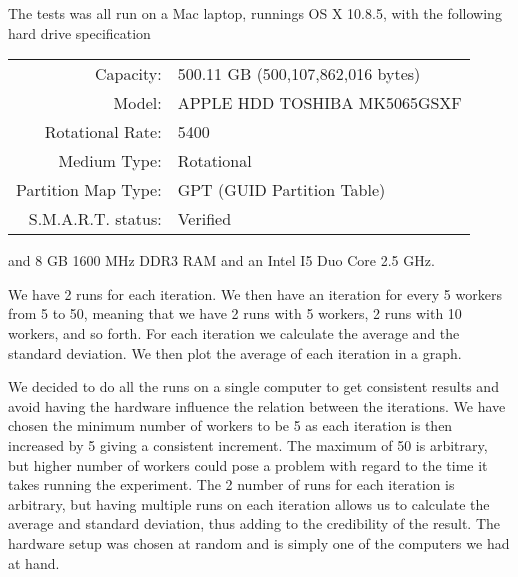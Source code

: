 \documentclass[a4paper, 11pt]{article}
\begin{document}
The tests was all run on a Mac laptop, runnings OS X 10.8.5, with the following hard drive specification

\begin{table}[H]
\begin{tabular}{rl}
Capacity:           & 500.11 GB (500,107,862,016 bytes) \\ 
Model:              & APPLE HDD TOSHIBA MK5065GSXF      \\   
Rotational Rate:    & 5400                              \\   
Medium Type:        & Rotational                        \\   
Partition Map Type: & GPT (GUID Partition Table)        \\   
S.M.A.R.T. status:  & Verified                             
\end{tabular}
\end{table}

and 8 GB 1600 MHz DDR3 RAM and an Intel I5 Duo Core 2.5 GHz.

We have 2 runs for each iteration. We then have an iteration for every 5 workers from 5 to 50, meaning that we have 2 runs with 5 workers, 2 runs with 10 workers, and so forth. For each iteration we calculate the average and the standard deviation. We then plot the average of each iteration in a graph.

We decided to do all the runs on a single computer to get consistent results and avoid having the hardware influence the relation between the iterations. We have chosen the minimum number of workers to be 5 as each iteration is then increased by 5 giving a consistent increment. The maximum of 50 is arbitrary, but higher number of workers could pose a problem with regard to the time it takes running the experiment. The 2 number of runs for each iteration is arbitrary, but having multiple runs on each iteration allows us to calculate the average and standard deviation, thus adding to the credibility of the result. The hardware setup was chosen at random and is simply one of the computers we had at hand.


\subsection{} %


\subsection{} %
\end{document}
